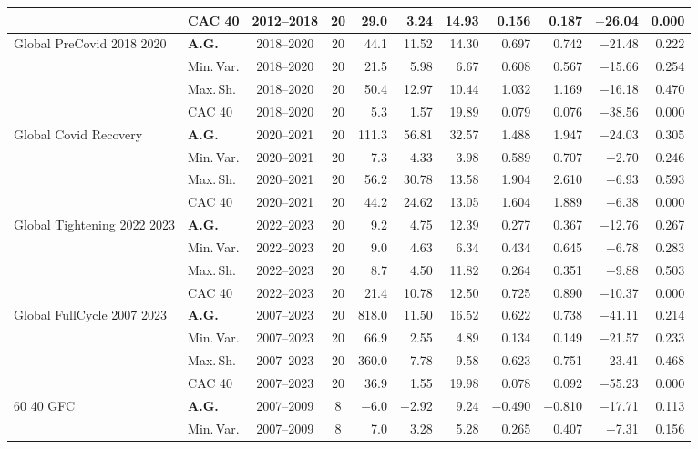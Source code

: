 \begin{longtable}{p{2.6cm} l c c r r r r r r r}
 & CAC 40 & 2012--2018 & 20 & 29.0 & 3.24 & 14.93 & 0.156 & 0.187 & $-$26.04 & 0.000 \\
\midrule
Global PreCovid 2018 2020 & \textbf{A.G.} & 2018--2020 & 20 & 44.1 & 11.52 & 14.30 & 0.697 & 0.742 & $-$21.48 & 0.222 \\
 & Min.\,Var. & 2018--2020 & 20 & 21.5 & 5.98 & 6.67 & 0.608 & 0.567 & $-$15.66 & 0.254 \\
 & Max.\,Sh. & 2018--2020 & 20 & 50.4 & 12.97 & 10.44 & 1.032 & 1.169 & $-$16.18 & 0.470 \\
 & CAC 40 & 2018--2020 & 20 & 5.3 & 1.57 & 19.89 & 0.079 & 0.076 & $-$38.56 & 0.000 \\
\midrule
Global Covid Recovery & \textbf{A.G.} & 2020--2021 & 20 & 111.3 & 56.81 & 32.57 & 1.488 & 1.947 & $-$24.03 & 0.305 \\
 & Min.\,Var. & 2020--2021 & 20 & 7.3 & 4.33 & 3.98 & 0.589 & 0.707 & $-$2.70 & 0.246 \\
 & Max.\,Sh. & 2020--2021 & 20 & 56.2 & 30.78 & 13.58 & 1.904 & 2.610 & $-$6.93 & 0.593 \\
 & CAC 40 & 2020--2021 & 20 & 44.2 & 24.62 & 13.05 & 1.604 & 1.889 & $-$6.38 & 0.000 \\
\midrule
Global Tightening 2022 2023 & \textbf{A.G.} & 2022--2023 & 20 & 9.2 & 4.75 & 12.39 & 0.277 & 0.367 & $-$12.76 & 0.267 \\
 & Min.\,Var. & 2022--2023 & 20 & 9.0 & 4.63 & 6.34 & 0.434 & 0.645 & $-$6.78 & 0.283 \\
 & Max.\,Sh. & 2022--2023 & 20 & 8.7 & 4.50 & 11.82 & 0.264 & 0.351 & $-$9.88 & 0.503 \\
 & CAC 40 & 2022--2023 & 20 & 21.4 & 10.78 & 12.50 & 0.725 & 0.890 & $-$10.37 & 0.000 \\
\midrule
Global FullCycle 2007 2023 & \textbf{A.G.} & 2007--2023 & 20 & 818.0 & 11.50 & 16.52 & 0.622 & 0.738 & $-$41.11 & 0.214 \\
 & Min.\,Var. & 2007--2023 & 20 & 66.9 & 2.55 & 4.89 & 0.134 & 0.149 & $-$21.57 & 0.233 \\
 & Max.\,Sh. & 2007--2023 & 20 & 360.0 & 7.78 & 9.58 & 0.623 & 0.751 & $-$23.41 & 0.468 \\
 & CAC 40 & 2007--2023 & 20 & 36.9 & 1.55 & 19.98 & 0.078 & 0.092 & $-$55.23 & 0.000 \\
\midrule
60 40 GFC & \textbf{A.G.} & 2007--2009 & 8 & $-$6.0 & $-$2.92 & 9.24 & $-$0.490 & $-$0.810 & $-$17.71 & 0.113 \\
 & Min.\,Var. & 2007--2009 & 8 & 7.0 & 3.28 & 5.28 & 0.265 & 0.407 & $-$7.31 & 0.156 \\

\end{longtable}
